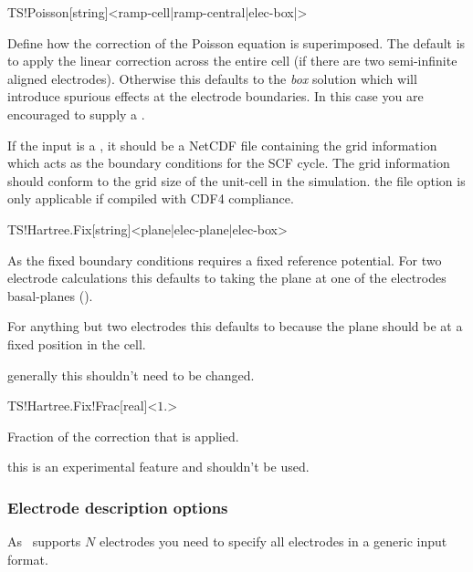 \begin{fdfentry}{TS!Poisson}[string]<ramp-cell|ramp-central|elec-box|>

  Define how the correction of the Poisson equation is
  superimposed. The default is to apply the linear correction across
  the entire cell (if there are two semi-infinite aligned electrodes).
  Otherwise this defaults to the \emph{box} solution which will
  introduce spurious effects at the electrode boundaries. In this case
  you are encouraged to supply a .

  If the input is a , it should be a NetCDF file containing
  the grid information which acts as the boundary conditions for the
  SCF cycle. 
  The grid information should conform to the grid size of the
  unit-cell in the simulation.
  \note the file option is only applicable if compiled with CDF4
  compliance.

\end{fdfentry}

\begin{fdfentry}{TS!Hartree.Fix}[string]<plane|elec-plane|elec-box>

  As the fixed boundary conditions requires a fixed reference
  potential. For two electrode calculations this defaults to taking
  the plane at one of the electrodes basal-planes (). 

  For anything but two electrodes this defaults to 
  because the plane should be at a fixed position in the cell. 

  \note generally this shouldn't need to be changed.

\end{fdfentry}

\begin{fdfentry}{TS!Hartree.Fix!Frac}[real]<$1.$>

  Fraction of the correction that is applied.

  \note this is an experimental feature and shouldn't be used.

\end{fdfentry}


\subsubsection{Electrode description options}

As \tsiesta\ supports $N$ electrodes you need to specify all
electrodes in a generic input format.

